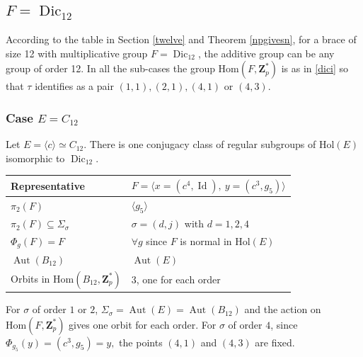 \documentclass[12pt]{article}
\theoremstyle{definition}
\newcommand{\Z}{\mathbf Z}
\newcommand{\Hol}{\mathrm{Hol}}
\newcommand{\Hom}{\mathrm{Hom}}
\newcommand{\Aut}{\operatorname{Aut}}
\newcommand{\Id}{\operatorname{Id}}
\newcommand{\Dic}{\operatorname{Dic}}
\begin{document}
\subsection{$F=\Dic_{12}$}

 According to the table in Section \ref{twelve}
and Theorem \ref{npgivesn}, for a brace of size 12 with multiplicative group  $F=\Dic_{12}$, the additive group can be any group of order 12. In all the sub-cases the group $\Hom(F,\Z_p^*)$ is as in \ref{dici} so that
$\tau$ identifies as a pair $(1,1), (2,1), (4,1)$ or $(4,3)$.


\subsubsection*{Case $E=C_{12}$}

Let $E=\langle c\rangle\simeq C_{12}$. There is  one conjugacy class of regular subgroups of $\Hol(E)$ isomorphic to $\Dic_{12}$. 

\begin{center}
    \begin{tabular}{|l|l|}
    \hline
      Representative& $F=\langle x=(c^4,\Id) ,\ y=(c^3,g_5)\rangle $ \\
      \hline
      $\pi_2(F)$ & $\langle g_5 \rangle$ \\
      $\pi_2(F)\subseteq \Sigma_{\sigma}$ &  $\sigma=(d,j)$ with $d=1,2,4$ \\
      $\Phi_g(F)=F$ & $\forall g$ since $F$ is normal in $\Hol(E)$\\
      $\Aut(B_{12})$ & $\Aut(E)$\\
      Orbits in $\Hom(B_{12},\Z_p^*)$ &  3, one for each order\\
      \hline
    \end{tabular}
\end{center}    

For $\sigma$ of order $1$ or $2$, $\Sigma_{\sigma}=\Aut(E)=\Aut(B_{12})$
and the action on $\Hom(F,\Z_p^*)$ gives one orbit for each order.
For $\sigma$ of order $4$, since $\Phi_{g_5}(y)=(c^3, g_5)=y,$
the points $(4,1)$ and $(4,3)$ are fixed.
\end{document}
